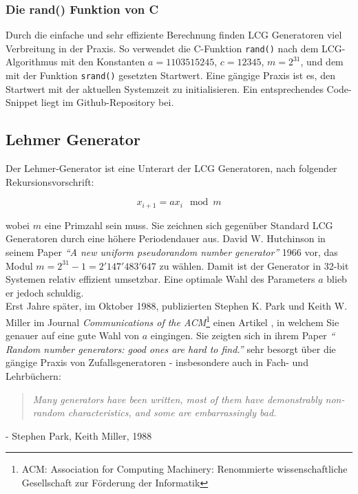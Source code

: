 \documentclass{book}
\begin{document}
\begin{refsection}
\subsubsection{Die rand() Funktion von C}
Durch die einfache und sehr effiziente Berechnung finden LCG Generatoren viel Verbreitung in der Praxis. So verwendet die C-Funktion \texttt{rand()} nach dem LCG-Algorithmus mit den Konstanten $a=1103515245$, $c=12345$, $m=2^{31}$, und dem mit der Funktion \texttt{srand()} gesetzten Startwert. \cite{rng:randFunction} Eine gängige Praxis ist es, den Startwert mit der aktuellen Systemzeit zu initialisieren. Ein entsprechendes Code-Snippet liegt im Github-Repository bei. \cite{rng:githubRepo} \\

\newpage
\subsection{Lehmer Generator} \label{subsec:Lehmer}
Der Lehmer-Generator ist eine Unterart der LCG Generatoren, nach folgender Rekursionsvorschrift:

\begin{equation}
	x_{i+1} = a x_{i} \mod{m}
	\label{equ:lehmer}
\end{equation}

wobei $m$ eine Primzahl sein muss. Sie zeichnen sich gegenüber Standard LCG Generatoren durch eine höhere Periodendauer aus. David W. Hutchinson in seinem Paper \textit{``A new uniform pseudorandom number generator''} 1966 \cite{rng:Hutchinson1966} vor, das Modul  $m = 2^{31} - 1 = 2'147'483'647$ zu wählen. Damit ist der Generator in 32-bit Systemen relativ effizient umsetzbar. Eine optimale Wahl des Parameters $a$ blieb er jedoch schuldig. \\

Erst Jahre später, im Oktober 1988, publizierten Stephen K. Park und Keith W. Miller im Journal \textit{Communications of the ACM}\footnote{ACM: Association for Computing Machinery: Renommierte wissenschaftliche Gesellschaft zur Förderung der Informatik} einen Artikel \cite{rng:ParkMiller1988}, in welchem Sie genauer auf eine gute Wahl von $a$ eingingen. Sie zeigten sich in ihrem Paper \textit{`` Random number generators: good ones are hard to find.''} sehr besorgt über die gängige Praxis von Zufallsgeneratoren - insbesondere auch in Fach- und Lehrbüchern:

\begin{quote}
	\textit{Many generators have been written, most of them have demonstrably non-random characteristics, and some are embarrassingly bad.}
\end{quote}
\begin{flushright}
	- Stephen Park, Keith Miller, 1988 \cite{rng:ParkMiller1988}
\end{flushright}


\end{refsection}
\end{document}
